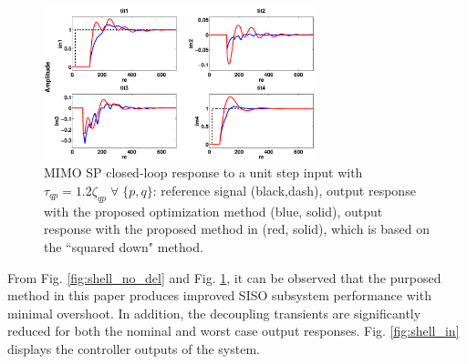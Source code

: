 \documentclass[A4, 10pt, conference]{ieeeconf}
\begin{document}
\begin{figure}[]
\centering
{}
\centerline{\includegraphics[width=0.7\textwidth]{pics/Rob_comp_LD35_2.eps}}
\caption{MIMO SP closed-loop response to a unit step input with $\tau_{qp}=1.2\zeta_{qp} \; \forall \; \{p,q\}$: reference signal (black,dash), output response with the proposed optimization method (blue, solid), output response with the proposed method in \cite{RC06} (red, solid), which is based on the ``squared down" method.}
\label{fig:shell_del}
\end{figure}
From Fig. \ref{fig:shell_no_del} and Fig. \ref{fig:shell_del}, it can be observed that the purposed method in this paper produces improved SISO subsystem performance with minimal overshoot. In addition, the decoupling transients are significantly reduced for both the nominal and worst case output responses. Fig. \ref{fig:shell_in} displays the controller outputs of the system. 
\end{document}
